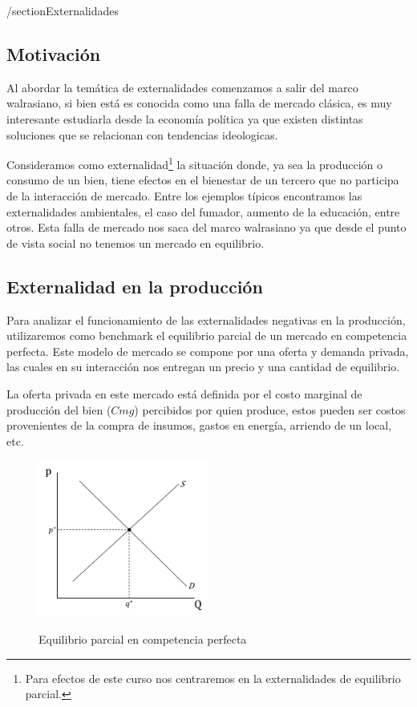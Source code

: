 /section{Externalidades}

\subsection{Motivación}
Al abordar la temática de externalidades comenzamos a salir del marco walrasiano, si bien está es conocida como una falla de mercado clásica, es muy interesante estudiarla desde la economía política ya que existen distintas soluciones que se relacionan con tendencias ideologicas.

Consideramos como externalidad\footnote{Para efectos de este curso nos centraremos en la externalidades de equilibrio parcial.} la situación donde, ya sea la producción o consumo de un bien, tiene efectos en el bienestar de un tercero que no participa de la interacción de mercado. Entre los ejemplos típicos encontramos las externalidades ambientales, el caso del fumador, aumento de la educación, entre otros. Esta falla de mercado nos saca del marco walrasiano ya que desde el punto de vista social no tenemos un mercado en equilibrio.

\subsection{Externalidad en la producción}

Para analizar el funcionamiento de las externalidades negativas en la producción, utilizaremos como benchmark el equilibrio parcial de un mercado en competencia perfecta. Este modelo de mercado se compone por una oferta y demanda privada, las cuales en su interacción nos entregan un precio y una cantidad de equilibrio.

La oferta privada en este mercado está definida por el costo marginal de producción del bien ($Cmg$) percibidos por quien produce, estos pueden ser costos provenientes de la compra de insumos, gastos en energía, arriendo de un local, etc. 

\begin{figure}[htbp]
    \centering
    \caption{Equilibrio parcial en competencia perfecta}
    \includegraphics[width=0.5\textwidth]{Figuras/Eq Parcial EXT.jpg}
    \label{fig:Eq parcial}
\end{figure}

